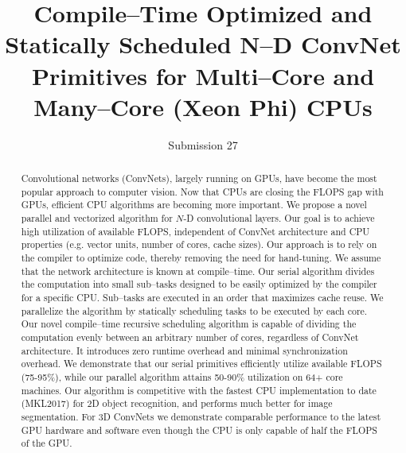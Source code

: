 \documentclass[sigconf, review]{acmart}
\begin{document}
\title{Compile--Time Optimized and Statically Scheduled N--D ConvNet
  Primitives for Multi--Core and Many--Core (Xeon Phi) CPUs }




\author{Submission 27}

\begin{abstract}

  Convolutional networks (ConvNets), largely running on GPUs, have
  become the most popular approach to computer vision.  Now that CPUs
  are closing the FLOPS gap with GPUs, efficient CPU algorithms are
  becoming more important.  We propose a novel parallel and vectorized
  algorithm for $N$-D convolutional layers.  Our goal is to achieve
  high utilization of available FLOPS, independent of ConvNet
  architecture and CPU properties (e.g. vector units, number of cores,
  cache sizes). Our approach is to rely on the compiler to optimize
  code, thereby removing the need for hand-tuning.  We assume that the
  network architecture is known at compile--time. Our serial algorithm
  divides the computation into small sub--tasks designed to be easily
  optimized by the compiler for a specific CPU.  Sub--tasks are
  executed in an order that maximizes cache reuse.  We parallelize the
  algorithm by statically scheduling tasks to be executed by each
  core.  Our novel compile--time recursive scheduling algorithm is
  capable of dividing the computation evenly between an arbitrary number
  of cores, regardless of ConvNet architecture.  It introduces
  zero runtime overhead and minimal synchronization overhead.  We
  demonstrate that our serial primitives efficiently utilize available
  FLOPS (75-95\%), while our parallel algorithm attains 50-90\%
  utilization on 64+ core machines. Our algorithm is competitive with
  the fastest CPU implementation to date (MKL2017) for 2D object
  recognition, and performs much better for image segmentation.
  For 3D ConvNets we demonstrate comparable performance to the
  latest GPU hardware and software even though the CPU is only capable
  of half the FLOPS of the GPU.

\end{abstract}

\maketitle















\end{document}
